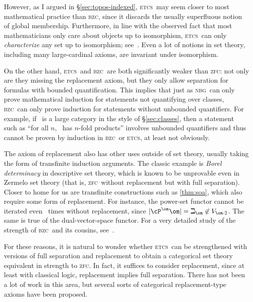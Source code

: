 \documentclass[12pt]{amsart}
\def\zfc{\textsc{zfc}}
\def\nbg{\textsc{nbg}}
\def\etcs{\textsc{etcs}}
\def\bzc{\textsc{bzc}}
\begin{document}
However, as I argued in \S\ref{sec:topos-indexed}, \etcs\ may seem
closer to most mathematical practice than \bzc, since it discards the
usually superfluous notion of global membership.  Furthermore, in line
with the observed fact that most mathematicians only care about
objects up to isomorphism, \etcs\ can only \emph{characterize} any set
up to isomorphism; see~\cite{mclarty:numbers}.  Even a lot of notions
in set theory, including many large-cardinal axioms, are invariant
under isomorphism.

On the other hand, \etcs\ and \bzc\ are both significantly weaker than
\zfc: not only are they missing the replacement axiom, but they only
allow separation for formulas with bounded quantification.  This
implies that just as \nbg\ can only prove mathematical induction for
statements not quantifying over classes, \bzc\ can only prove
induction for statements without unbounded quantifiers.  For example,
if \bA\ is a large category in the style of \S\ref{sec:classes}, then
a statement such as ``for all $n$, \bA\ has $n$-fold products''
involves unbounded quantifiers and thus cannot be proven by induction
in \bzc\ or \etcs, at least not obviously.

The axiom of replacement also has other uses outside of set theory,
usually taking the form of transfinite induction arguments.  The
classic example is \emph{Borel determinacy} in descriptive set theory,
which is known to be unprovable even in Zermelo set theory (that is,
\zfc\ without replacement but with full separation).  Closer to home
for us are transfinite constructions such as \autoref{thm:soa}, which
also require some form of replacement.  For instance, the power-set
functor cannot be iterated even \om\ times without replacement, since
$|\cP^\om \om|=\beth_\om \not\in V_{\om\cdot 2}$.  The same is true of
the dual-vector-space functor.  For a very detailed study of the
strength of \bzc\ and its cousins, see~\cite{mathias:str-maclane}.

For these reasons, it is natural to wonder whether \etcs\ can be
strengthened with versions of full separation and replacement to
obtain a categorical set theory equivalent in strength to \zfc.  In
fact, it suffices to consider replacement, since at least with
classical logic, replacement implies full separation.  There has not
been a lot of work in this area, but several sorts of categorical
replacement-type axioms have been proposed.
\end{document}
